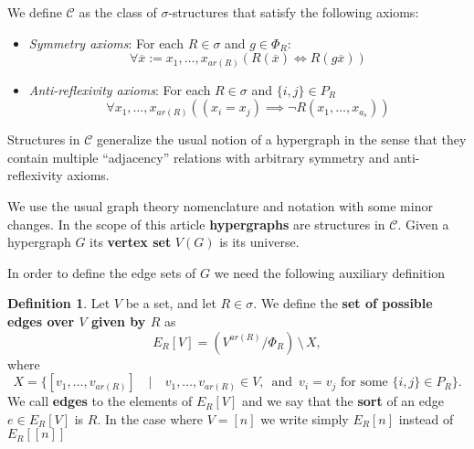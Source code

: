 \documentclass[12pt,notitlepage,a4paper]{article}
\theoremstyle{definition}
\newtheorem{definition}{Definition}[section]
\begin{document}


We define $\mathcal{C}$ as the 
class of $\sigma$-structures that
satisfy the 
following axioms: 
\begin{itemize}
	\item \textit{Symmetry axioms}: For each $R\in \sigma$ and
	$g\in \Phi_R$:
	\[ \forall \overline{x}:=x_1,\dots, x_{ar(R)} \left(  R(\overline{x})
	\iff R(g \overline{x}) \right)    \]
	\item \textit{Anti-reflexivity axioms}: For each 
	$R\in \sigma$ and $\{i,j\}\in P_R$
	\[ \forall x_1,\dots, x_{ar(R)} 
	\left( (x_i=x_j) \implies \neg R(x_1,\dots, x_{a_s})
	\right)\]
\end{itemize}

Structures in $\mathcal{C}$ generalize the usual notion of a hypergraph
in the sense that they contain multiple ``adjacency'' relations with arbitrary 
symmetry and anti-reflexivity axioms. \par
We use the usual graph theory nomenclature and notation with some minor changes. 
In the scope of this article \textbf{hypergraphs}
are structures in $\mathcal{C}$.
Given a hypergraph $G$ its \textbf{vertex set} $V(G)$
is its universe.\par
In order to define the edge sets of $G$ we need the following auxiliary definition
\begin{definition} 
	Let $V$ be a set, and let $R\in \sigma$.
	We define the \textbf{set of possible edges over $V$
	given by $R$} as
	\[ E_R[V]= (V^{ar(R)}/\Phi_R)\, \setminus \, X, \]
	where
	\[
	X=
	\Big\{ [v_1,\dots,v_{ar(R)}]  
	\quad \Big| \quad
	v_1,\dots,v_{ar(R)}\in V, \,
	\text{ and } 
	 \, v_i=v_j \text{ for some } 
	\{i,j\}\in P_R \Big\}.
	\]
	We call \textbf{edges} to the elements of
	$E_R[V]$ and we say that the \textbf{sort} of an edge $e\in E_R[V]$
	is $R$.	In the case where $V=[n]$ we write simply $E_R[n]$ instead
	of $E_R[[n]]$
\end{definition}
\end{document}
